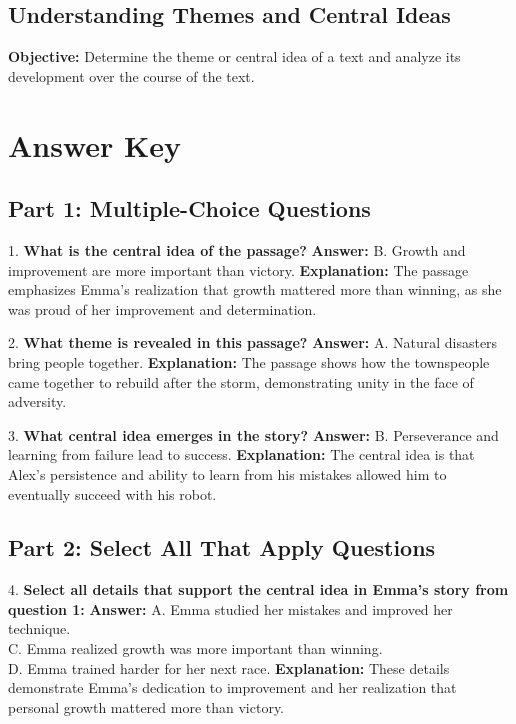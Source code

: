 \documentclass[12pt]{article}
\begin{document}
\subsection*{Understanding Themes and Central Ideas}
\onehalfspacing

\begin{tcolorbox}[colframe=black!40, colback=gray!0, title=Learning Objective]
\textbf{Objective:} Determine the theme or central idea of a text and analyze its development over the course of the text.
\end{tcolorbox}


\section*{Answer Key}

\subsection*{Part 1: Multiple-Choice Questions}

1. \textbf{What is the central idea of the passage?}  
\textbf{Answer:} B. Growth and improvement are more important than victory.  
\textbf{Explanation:} The passage emphasizes Emma’s realization that growth mattered more than winning, as she was proud of her improvement and determination.

\vspace{1cm}
2. \textbf{What theme is revealed in this passage?}  
\textbf{Answer:} A. Natural disasters bring people together.  
\textbf{Explanation:} The passage shows how the townspeople came together to rebuild after the storm, demonstrating unity in the face of adversity.

\vspace{1cm}
3. \textbf{What central idea emerges in the story?}  
\textbf{Answer:} B. Perseverance and learning from failure lead to success.  
\textbf{Explanation:} The central idea is that Alex’s persistence and ability to learn from his mistakes allowed him to eventually succeed with his robot.

\subsection*{Part 2: Select All That Apply Questions}

4. \textbf{Select all details that support the central idea in Emma’s story from question 1:}  
\textbf{Answer:} A. Emma studied her mistakes and improved her technique. \\
C. Emma realized growth was more important than winning. \\
D. Emma trained harder for her next race.  
\textbf{Explanation:} These details demonstrate Emma’s dedication to improvement and her realization that personal growth mattered more than victory.
\end{document}
